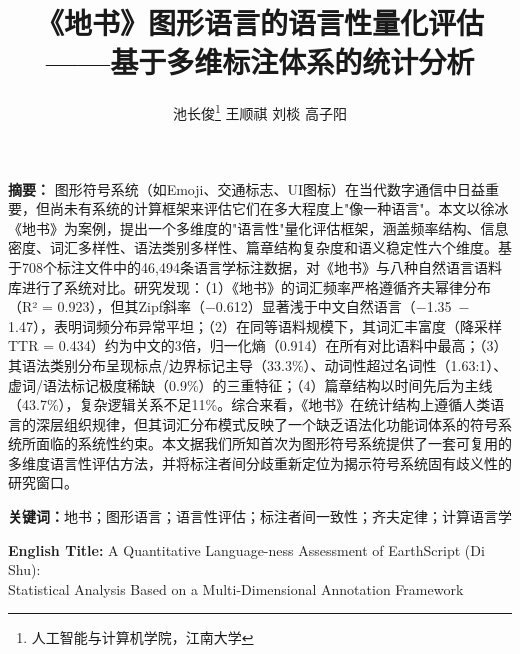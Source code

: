 \documentclass[12pt,a4paper,UTF8,fontset=founder]{ctexart}
\title{{\Large \textbf{《地书》图形语言的语言性量化评估}}\\[4pt]
       {\large ——基于多维标注体系的统计分析}}
\author{
  池长俊\thanks{人工智能与计算机学院，江南大学} \quad
  王顺祺 \quad
  刘棪 \quad
  高子阳}
\date{}
\begin{document}
\maketitle

\begin{center}
\begin{minipage}{0.92\textwidth}
\small
\setlength{\baselineskip}{1.6\baselineskip}
\textbf{摘\quad 要：}
图形符号系统（如Emoji、交通标志、UI图标）在当代数字通信中日益重要，但尚未有系统的计算框架来评估它们在多大程度上"像一种语言"。本文以徐冰《地书》为案例，提出一个多维度的"语言性"量化评估框架，涵盖频率结构、信息密度、词汇多样性、语法类别多样性、篇章结构复杂度和语义稳定性六个维度。基于708个标注文件中的46,494条语言学标注数据，对《地书》与八种自然语言语料库进行了系统对比。研究发现：（1）《地书》的词汇频率严格遵循齐夫幂律分布（R² = 0.923），但其Zipf斜率（$-$0.612）显著浅于中文自然语言（$-$1.35~$-$1.47），表明词频分布异常平坦；（2）在同等语料规模下，其词汇丰富度（降采样TTR = 0.434）约为中文的3倍，归一化熵（0.914）在所有对比语料中最高；（3）其语法类别分布呈现标点/边界标记主导（33.3\%）、动词性超过名词性（1.63:1）、虚词/语法标记极度稀缺（0.9\%）的三重特征；（4）篇章结构以时间先后为主线（43.7\%），复杂逻辑关系不足11\%。综合来看，《地书》在统计结构上遵循人类语言的深层组织规律，但其词汇分布模式反映了一个缺乏语法化功能词体系的符号系统所面临的系统性约束。本文据我们所知首次为图形符号系统提供了一套可复用的多维度语言性评估方法，并将标注者间分歧重新定位为揭示符号系统固有歧义性的研究窗口。
\end{minipage}
\end{center}

\vspace{0.3cm}

\begin{center}
\begin{minipage}{0.92\textwidth}
\small
\textbf{关键词：}地书；图形语言；语言性评估；标注者间一致性；齐夫定律；计算语言学
\end{minipage}
\end{center}

\vspace{0.5cm}

\begin{center}
\small
\textbf{English Title:} A Quantitative Language-ness Assessment of EarthScript (Di Shu):\\
Statistical Analysis Based on a Multi-Dimensional Annotation Framework
\end{center}

\newpage
\end{document}

